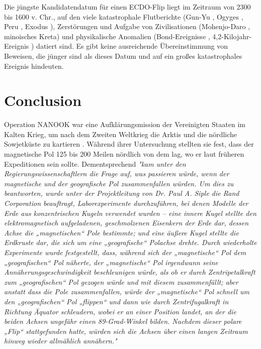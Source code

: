 \documentclass[10pt,twocolumn,letterpaper]{article}
\begin{document}
Die jüngste Kandidatendatum für einen ECDO-Flip liegt im Zeitraum von 2300 bis 1600 v. Chr., auf den viele katastrophale Flutberichte (Gun-Yu \cite{113,114,115}, Ogyges \cite{116,117}, Peru \cite{118,119}, Exodus \cite{120}), Zerstörungen und Aufgabe von Zivilisationen (Mohenjo-Daro \cite{121}, minoisches Kreta\cite{100,101}) und physikalische Anomalien (Bond-Ereignisse \cite{122}, 4,2-Kilojahr-Ereignis \cite{90}) datiert sind. Es gibt keine ausreichende Übereinstimmung von Beweisen, die jünger sind als dieses Datum und auf ein großes katastrophales Ereignis hindeuten.

\section{Conclusion}

Operation NANOOK war eine Aufklärungsmission der Vereinigten Staaten im Kalten Krieg, um nach dem Zweiten Weltkrieg die Arktis und die nördliche Sowjetküste zu kartieren \cite{137}. Während ihrer Untersuchung stellten sie fest, dass der magnetische Pol 125 bis 200 Meilen nördlich von dem lag, wo er laut früheren Expeditionen sein sollte. Dementsprechend \textit{"kam unter den Regierungswissenschaftlern die Frage auf, was passieren würde, wenn der magnetische und der geografische Pol zusammenfallen würden. Um dies zu beantworten, wurde unter der Projektleitung von Dr. Paul A. Siple die Rand Corporation beauftragt, Laborexperimente durchzuführen, bei denen Modelle der Erde aus konzentrischen Kugeln verwendet wurden – eine innere Kugel stellte den elektromagnetisch aufgeladenen, geschmolzenen Eisenkern der Erde dar, dessen Achse die „magnetischen“ Pole bestimmte; und eine äußere Kugel stellte die Erdkruste dar, die sich um eine „geografische“ Polachse drehte. Durch wiederholte Experimente wurde festgestellt, dass, während sich der „magnetische“ Pol dem „geografischen“ Pol näherte, der „magnetische“ Pol irgendwann seine Annäherungsgeschwindigkeit beschleunigen würde, als ob er durch Zentripetalkraft zum „geografischen“ Pol gezogen würde und mit diesem zusammenfällt; aber anstatt dass die Pole zusammenfallen, würde der „magnetische“ Pol schnell um den „geografischen“ Pol „flippen“ und dann wie durch Zentrifugalkraft in Richtung Äquator schleudern, wobei er an einer Position landet, an der die beiden Achsen ungefähr einen 89-Grad-Winkel bilden. Nachdem dieser polare „Flip“ stattgefunden hatte, würden sich die Achsen über einen langen Zeitraum hinweg wieder allmählich annähern."} \cite{138,139}
\end{document}

